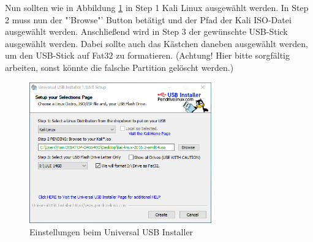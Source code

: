 Nun sollten wie in Abbildung \ref{fig:start usb installer} in Step 1 Kali Linux ausgewählt werden. In Step 2 muss nun der "'Browse"' Button betätigt und der Pfad der Kali ISO-Datei ausgewählt werden. Anschließend wird in Step 3 der gewünschte USB-Stick ausgewählt werden. Dabei sollte auch das Kästchen daneben ausgewählt werden, um den USB-Stick auf Fat32 zu formatieren. (Achtung! Hier bitte sorgfältig arbeiten, sonst könnte die falsche Partition gelöscht werden.)
	\begin{figure}[H]
		\centering
		\includegraphics[width=0.7\textwidth]{images/prep/start_usb_installer.png}
		\caption{Einstellungen beim Universal USB Installer}
		\label{fig:start usb installer}
	\end{figure}


